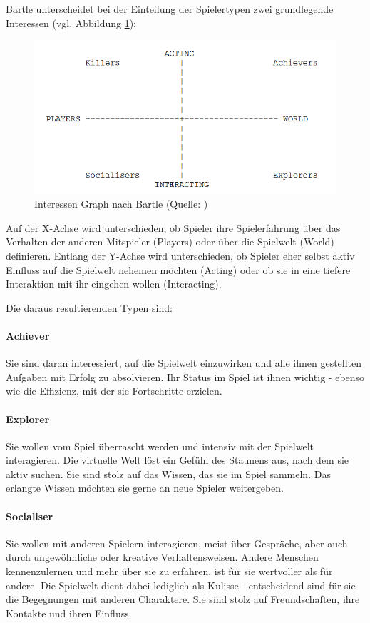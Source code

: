 Bartle unterscheidet bei der Einteilung der Spielertypen zwei grundlegende Interessen (vgl. Abbildung \ref{fig:bartle-muds}):

\begin{figure}[ht]
\centering
\includegraphics[width=1\linewidth]{content/pictures/basic_interests.PNG}
\caption{Interessen Graph nach Bartle (Quelle: \cite{bartle_hearts_1996})}
\label{fig:bartle-muds}
\end{figure}

Auf der X-Achse wird unterschieden, ob Spieler ihre Spielerfahrung über das Verhalten der anderen Mitspieler (Players) oder über die Spielwelt (World) definieren. Entlang der Y-Achse wird unterschieden, ob Spieler eher selbst aktiv Einfluss auf die Spielwelt nehemen möchten (Acting) oder ob sie in eine tiefere Interaktion mit ihr eingehen wollen (Interacting).

Die daraus resultierenden Typen sind:
\paragraph{Achiever}
Sie sind daran interessiert, auf die Spielwelt einzuwirken und alle ihnen gestellten Aufgaben mit Erfolg zu absolvieren. Ihr Status im Spiel ist ihnen wichtig - ebenso wie die Effizienz, mit der sie Fortschritte erzielen.

\paragraph{Explorer}
Sie wollen vom Spiel überrascht werden und intensiv mit der Spielwelt interagieren. Die virtuelle Welt löst ein Gefühl des Staunens aus, nach dem sie aktiv suchen. Sie sind stolz auf das Wissen, das sie im Spiel sammeln. Das erlangte Wissen möchten sie gerne an neue Spieler weitergeben.

\paragraph{Socialiser}
Sie wollen mit anderen Spielern interagieren, meist über Gespräche, aber auch durch ungewöhnliche oder kreative Verhaltensweisen. Andere Menschen kennenzulernen und mehr über sie zu erfahren, ist für sie wertvoller als für andere. Die Spielwelt dient dabei lediglich als Kulisse - entscheidend sind für sie die Begegnungen mit anderen Charaktere. Sie sind stolz auf Freundschaften, ihre Kontakte und ihren Einfluss.

